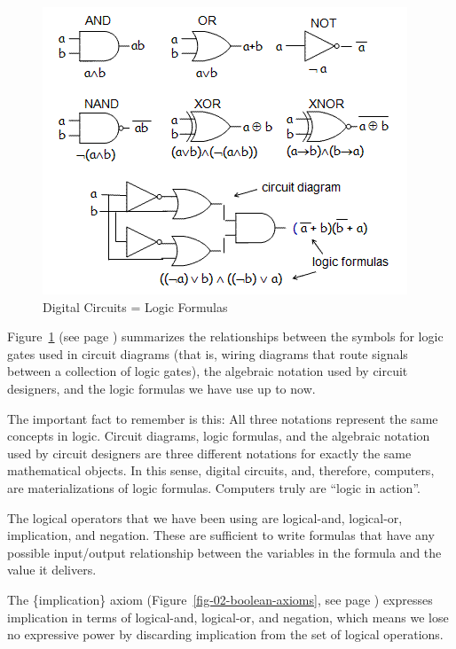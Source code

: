 \begin{figure}
\begin{center}
\includegraphics[scale=0.7]{Resources/LogicGates.png}
\end{center}
\caption{Digital Circuits = Logic Formulas}
\label{fig-02-logic-gates}
\end{figure}

Figure~\ref{fig-02-logic-gates} (see page \pageref{fig-02-logic-gates})
summarizes the relationships between
the symbols for logic gates used in circuit diagrams (that is,
wiring diagrams that route signals between a collection of logic gates),
the algebraic notation used by circuit designers,
and the logic formulas we have use up to now.

The important fact to remember is this: All three notations
represent the same concepts in logic. Circuit diagrams, logic formulas,
and the algebraic notation used by circuit designers are three
different notations for exactly the same mathematical objects.
In this sense, digital circuits, and, therefore, computers,
are materializations of logic formulas. Computers truly are
``logic in action''.

The logical operators that we have been using are
logical-and, logical-or, implication, and negation.
These are sufficient to write formulas that have
any possible input/output relationship between the
variables in the formula and the value it delivers.

The \{implication\} axiom
(Figure~\ref{fig-02-boolean-axioms}, see page \pageref{fig-02-boolean-axioms})
expresses implication in terms of logical-and, logical-or,
and negation, which means we lose no expressive power by
discarding implication from the set of logical operations.

